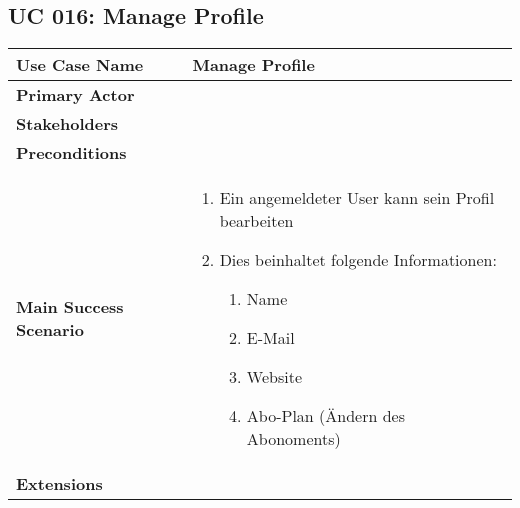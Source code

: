 \subsection{UC 016: Manage Profile}
\label{uc:016-manage-profile}

\begin{tabular}{|l|p{}|}
\hline
\textbf{Use Case Name} 	&	Manage Profile	\\ \hline
\textbf{Primary Actor} 	&		\\ \hline
\textbf{Stakeholders}	&		\\ \hline
\textbf{Preconditions}	&		\\ \hline
\textbf{Main Success Scenario}	&
\begin{enumerate}
	\item Ein angemeldeter User kann sein Profil bearbeiten
	\item Dies beinhaltet folgende Informationen:
	\begin{enumerate}
	    \item Name
	    \item E-Mail
	    \item Website
	    \item Abo-Plan (Ändern des Abonoments)
	\end{enumerate}
\end{enumerate}
\\ \hline
\textbf{Extensions}	& 	\\ \hline
\end{tabular}